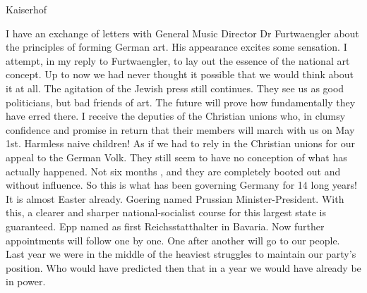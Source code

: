 Kaiserhof

I have an exchange of letters with General Music Director Dr Furtwaengler about the principles of forming German art. His appearance excites some sensation. I attempt, in my reply to Furtwaengler, to lay out the essence of the national art concept. Up to now we had never thought it possible that we would think about it at all. The agitation of the Jewish press still continues. They see us as good politicians, but bad friends of art. The future will prove how fundamentally they have erred there. I receive the deputies of the Christian unions who, in clumsy confidence  and promise in return that their members will march with us on May 1st. Harmless naive children! As if we had to rely in the Christian unions for our appeal to the German Volk. They still seem to have no conception of what has actually happened. Not six months , and they are completely booted out and without influence. So this is what has been governing Germany for 14 long years! It is almost Easter already.
Goering named Prussian Minister-President. With this, a clearer and sharper national-socialist course for this largest state is guaranteed. Epp named as first Reichsstatthalter in Bavaria. Now further appointments will follow one by one. One  after another will go to our people. Last year we were in the middle of the heaviest struggles to maintain our party's position. Who would have predicted then that in a year we would have already be in power.